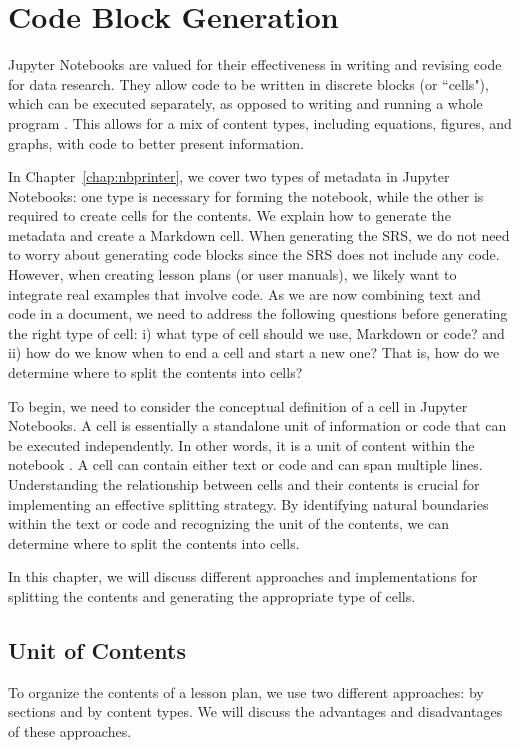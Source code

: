 \chapter{Code Block Generation} \label{chap:codeBlock}
Jupyter Notebooks are valued for their effectiveness in writing and revising 
code for data research. They allow code to be written in discrete blocks (or 
``cells"), which can be executed separately, as opposed to writing and running 
a whole program \cite{jupyterNotebookUsage}. This allows for a mix of content 
types, including equations, figures, and graphs, with code to better present 
information. 

In Chapter~\ref{chap:nbprinter}, we cover two types of metadata in Jupyter 
Notebooks: one type is necessary for forming the notebook, while the other is 
required to create cells for the contents. We explain how to generate the 
metadata and create a Markdown cell. When generating the SRS, we do not need to 
worry about generating code blocks since the SRS does not include any code. 
However, when creating lesson plans (or user manuals), we likely want to 
integrate real examples that involve code. As we are now combining text and 
code in a document, we need to address the following questions before 
generating the right type of cell: i) what type of cell should we use, Markdown 
or code? and ii) how do we know when to end a cell and start a new one? That 
is, how do we determine where to split the contents into cells?
 
To begin, we need to consider the conceptual definition of a cell in Jupyter 
Notebooks. A cell is essentially a standalone unit of information or code that 
can be executed independently. In other words, it is a unit of content within 
the notebook \cite{cellsseparation}. A cell can contain either text or code and 
can span multiple lines. Understanding the relationship between cells and their 
contents is crucial for implementing an effective splitting strategy. By 
identifying natural boundaries within the text or code and recognizing the unit 
of the contents, we can determine where to split the contents into cells.

In this chapter, we will discuss different approaches and implementations for 
splitting the contents and generating the appropriate type of cells.

\section{Unit of Contents}
To organize the contents of a lesson plan, we use two different approaches: by 
sections and by content types. We will discuss the advantages and disadvantages 
of these approaches.

